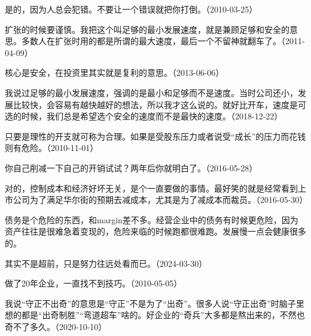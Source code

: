 
是的，因为人总会犯错。不要让一个错误就把你打倒。（2010-03-25）


扩张的时候要谨慎。我把这个叫足够的最小发展速度，就是兼顾足够和安全的意思。多数人在扩张时用的都是所谓的最大速度，最后一个不留神就翻车了。（2011-04-09）


核心是安全，在投资里其实就是复利的意思。（2013-06-06）

我说过足够的最小发展速度，强调的是最小和足够而不是速度。当时公司还小，发展比较快，会容易有越快越好的想法，所以我才这么说的。就好比开车，速度是可选的时候，我们总是希望选个安全的速度而不是最快的速度。（2018-12-22）


只要是理性的开支就可称为合理。如果是受股东压力或者说受“成长”的压力而花钱则有危险。（2010-11-01）


你自己削减一下自己的开销试试？两年后你就明白了。（2016-05-28）


对的，控制成本和经济好坏无关，是个一直要做的事情。最好笑的就是经常看到上市公司为了满足华尔街的预期去减成本，尤其是为了减成本而裁员。（2016-05-30）

债务是个危险的东西，和margin差不多。经营企业中的债务有时候更危险，因为资产往往是很难急着变现的，危险来临的时候跑都很难跑。发展慢一点会健康很多的。


其实不是超前，只是努力往远处看而已。（2024-03-30）


做了20年企业，一直找不到技巧。（2010-05-05）

我说“守正不出奇”的意思是“守正”不是为了“出奇”。很多人说“守正出奇”时脑子里想的都是“出奇制胜”“弯道超车”啥的。好企业的“奇兵”大多都是熬出来的，不然也奇不了多久。（2020-10-10）


